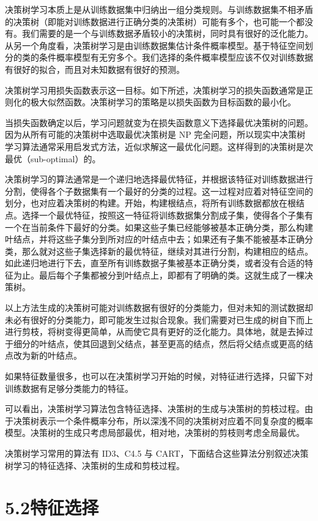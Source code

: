 \documentclass[UTF8, 12pt, fontset=fandol, oneside]{ctexart}
\begin{document}
决策树学习本质上是从训练数据集中归纳出一组分类规则。与训练数据集不相矛盾的决策树（即能对训练数据进行正确分类的决策树）可能有多个，也可能一个都没有。我们需要的是一个与训练数据矛盾较小的决策树，同时具有很好的泛化能力。从另一个角度看，决策树学习是由训练数据集估计条件概率模型。基于特征空间划分的类的条件概率模型有无穷多个。我们选择的条件概率模型应该不仅对训练数据有很好的拟合，而且对未知数据有很好的预测。

决策树学习用损失函数表示这一目标。如下所述，决策树学习的损失函数通常是正则化的极大似然函数。决策树学习的策略是以损失函数为目标函数的最小化。

当损失函数确定以后，学习问题就变为在损失函数意义下选择最优决策树的问题。因为从所有可能的决策树中选取最优决策树是 NP 完全问题，所以现实中决策树学习算法通常采用启发式方法，近似求解这一最优化问题。这样得到的决策树是次最优（sub-optimal）的。

决策树学习的算法通常是一个递归地选择最优特征，并根据该特征对训练数据进行分割，使得各个子数据集有一个最好的分类的过程。这一过程对应着对特征空间的划分，也对应着决策树的构建。开始，构建根结点，将所有训练数据都放在根结点。选择一个最优特征，按照这一特征将训练数据集分割成子集，使得各个子集有一个在当前条件下最好的分类。如果这些子集已经能够被基本正确分类，那么构建叶结点，并将这些子集分到所对应的叶结点中去；如果还有子集不能被基本正确分类，那么就对这些子集选择新的最优特征，继续对其进行分割，构建相应的结点。如此递归地进行下去，直至所有训练数据子集被基本正确分类，或者没有合适的特征为止。最后每个子集都被分到叶结点上，即都有了明确的类。这就生成了一棵决策树。

以上方法生成的决策树可能对训练数据有很好的分类能力，但对未知的测试数据却未必有很好的分类能力，即可能发生过拟合现象。我们需要对已生成的树自下而上进行剪枝，将树变得更简单，从而使它具有更好的泛化能力。具体地，就是去掉过于细分的叶结点，使其回退到父结点，甚至更高的结点，然后将父结点或更高的结点改为新的叶结点。

如果特征数量很多，也可以在决策树学习开始的时候，对特征进行选择，只留下对训练数据有足够分类能力的特征。

可以看出，决策树学习算法包含特征选择、决策树的生成与决策树的剪枝过程。由于决策树表示一个条件概率分布，所以深浅不同的决策树对应着不同复杂度的概率模型。决策树的生成只考虑局部最优，相对地，决策树的剪枝则考虑全局最优。

决策树学习常用的算法有 ID3、C4.5 与 CART，下面结合这些算法分别叙述决策树学习的特征选择、决策树的生成和剪枝过程。

\section*{5.2\quad 特征选择}
\end{document}
